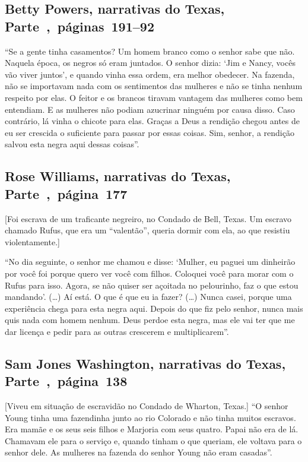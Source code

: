 \subsection{Betty Powers, narrativas do Texas, Parte~,~páginas~191--92}
\label{ref212}

``Se a gente tinha casamentos? Um homem branco como o senhor sabe que
não. Naquela época, os negros só eram juntados. O senhor dizia: `Jim e
Nancy, vocês vão viver juntos', e quando vinha essa ordem, era melhor
obedecer. Na fazenda, não se importavam nada com os sentimentos das
mulheres e não se tinha nenhum respeito por elas. O feitor e os brancos
tiravam vantagem das mulheres como bem entendiam. E as mulheres não
podiam azucrinar ninguém por causa disso. Caso contrário, lá vinha o
chicote para elas. Graças a Deus a rendição chegou antes de eu ser
crescida o suficiente para passar por essas coisas. Sim, senhor, a
rendição salvou esta negra aqui dessas coisas''.

\subsection{Rose Williams, narrativas do Texas, Parte~,~página~177}

{[}Foi escrava de um traficante negreiro, no Condado de Bell,
Texas. Um escravo chamado Rufus, que era um ``valentão'', queria dormir com
ela, ao que resistiu violentamente.{]}

``No dia seguinte, o senhor me chamou e disse: `Mulher, eu paguei um
dinheirão por você foi porque quero ver você com filhos. Coloquei você
para morar com o Rufus para isso. Agora, se não quiser ser açoitada no
pelourinho, faz o que estou mandando'. (\ldots{}) Aí está. O que é que
eu ia fazer? (\ldots{}) Nunca casei, porque uma experiência chega para
esta negra aqui. Depois do que fiz pelo senhor, nunca mais quis nada com
homem nenhum. Deus perdoe esta negra, mas ele vai ter que me dar licença
e pedir para as outras crescerem e multiplicarem''.

\subsection{Sam Jones Washington, narrativas do Texas, Parte~,~página~138}
\label{ref281}

{[}Viveu em situação de escravidão no Condado de Wharton, Texas.{]} ``O senhor Young tinha uma fazendinha junto ao rio Colorado e não tinha
muitos escravos. Era mamãe e os seus seis filhos e Marjoria com seus
quatro. Papai não era de lá. Chamavam ele para o serviço e, quando
tinham o que queriam, ele voltava para o senhor dele. As mulheres na
fazenda do senhor Young não eram casadas''.


